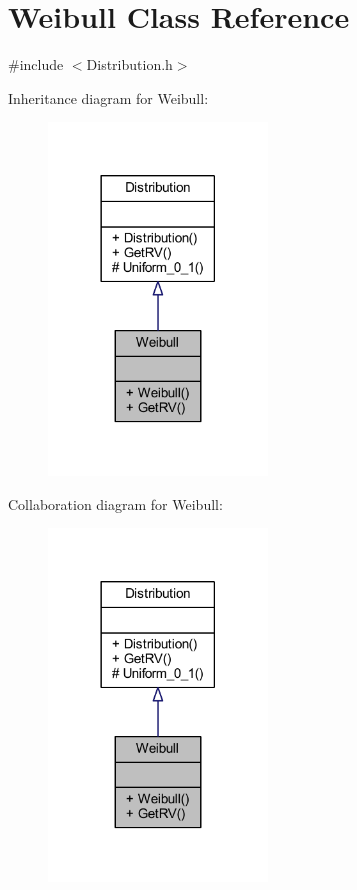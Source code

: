 \hypertarget{class_weibull}{}\section{Weibull Class Reference}
\label{class_weibull}


{\ttfamily \#include $<$Distribution.\+h$>$}



Inheritance diagram for Weibull\+:
\nopagebreak
\begin{figure}[H]
\begin{center}
\leavevmode
\includegraphics[width=165pt]{class_weibull__inherit__graph}
\end{center}
\end{figure}


Collaboration diagram for Weibull\+:
\nopagebreak
\begin{figure}[H]
\begin{center}
\leavevmode
\includegraphics[width=165pt]{class_weibull__coll__graph}
\end{center}
\end{figure}
